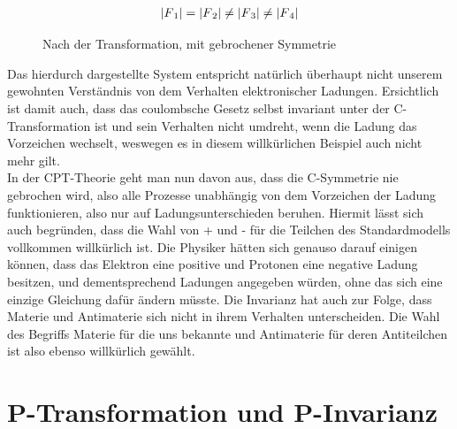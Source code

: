 \documentclass[12pt,a4paper]{scrartcl}
\numberwithin{equation}{section}
\begin{document}
\\
\begin{figure} [!ht]
\centering
{}
\begin{align}
    \lvert F\textsubscript{1}\rvert = \lvert F\textsubscript{2}\rvert \neq \lvert F\textsubscript{3}\rvert \neq \lvert F\textsubscript{4}\rvert
\end{align}
\caption{Nach der Transformation, mit gebrochener Symmetrie}
\end{figure}
Das hierdurch dargestellte System entspricht natürlich überhaupt nicht unserem gewohnten Verständnis von dem Verhalten elektronischer Ladungen. Ersichtlich ist damit auch, dass das coulombsche Gesetz selbst invariant unter der C-Transformation ist und sein Verhalten nicht umdreht, wenn die Ladung das Vorzeichen wechselt, weswegen es in diesem willkürlichen Beispiel auch nicht mehr gilt.
\\
In der CPT-Theorie geht man nun davon aus, dass die C-Symmetrie nie gebrochen wird, also alle Prozesse unabhängig von dem Vorzeichen der Ladung funktionieren, also nur auf Ladungsunterschieden beruhen. Hiermit lässt sich auch begründen, dass die Wahl von + und - für die Teilchen des Standardmodells vollkommen willkürlich ist. Die Physiker hätten sich genauso darauf einigen können, dass das Elektron eine positive und Protonen eine negative Ladung besitzen, und dementsprechend Ladungen angegeben würden, ohne das sich eine einzige Gleichung dafür ändern müsste. Die Invarianz hat auch zur Folge, dass Materie und Antimaterie sich nicht in ihrem Verhalten unterscheiden. Die Wahl des Begriffs Materie für die uns bekannte und Antimaterie für deren Antiteilchen ist also ebenso willkürlich gewählt.\cite{lueders54}

  \newpage  %

  \section{P-Transformation und P-Invarianz}
\end{document}
